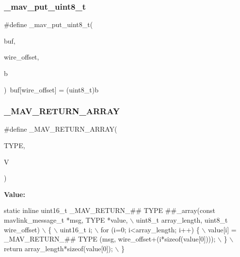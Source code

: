 \mbox{\label{protocol_8h_a25eacf3d37971b0b54c67e338d9f481a}} 
\subsubsection{\+\_\+mav\+\_\+put\+\_\+uint8\+\_\+t}
{\footnotesize\ttfamily \#define \+\_\+mav\+\_\+put\+\_\+uint8\+\_\+t(\begin{DoxyParamCaption}\item[{}]{buf,  }\item[{}]{wire\+\_\+offset,  }\item[{}]{b }\end{DoxyParamCaption})~buf[wire\+\_\+offset] = (uint8\+\_\+t)b}

\mbox{\label{protocol_8h_a056ba05a9133c8e4362514ffc523a24b}} 
\subsubsection{\+\_\+\+M\+A\+V\+\_\+\+R\+E\+T\+U\+R\+N\+\_\+\+A\+R\+R\+AY}
{\footnotesize\ttfamily \#define \+\_\+\+M\+A\+V\+\_\+\+R\+E\+T\+U\+R\+N\+\_\+\+A\+R\+R\+AY(\begin{DoxyParamCaption}\item[{}]{T\+Y\+PE,  }\item[{}]{V }\end{DoxyParamCaption})}

{\bfseries Value\+:}
\begin{DoxyCode}
\textcolor{keyword}{static} \textcolor{keyword}{inline} uint16\_t \_MAV\_RETURN\_## TYPE ##\_array(\textcolor{keyword}{const} mavlink\_message\_t *msg, TYPE *value, \(\backslash\)
                             uint8\_t array\_length, uint8\_t wire\_offset) \(\backslash\)
\{ \(\backslash\)
    uint16\_t i; \(\backslash\)
    for (i=0; i<array\_length; i++) \{ \(\backslash\)
        value[i] = \_MAV\_RETURN\_## TYPE (msg, wire\_offset+(i*\textcolor{keyword}{sizeof}(value[0]))); \(\backslash\)
    \} \(\backslash\)
    return array\_length*\textcolor{keyword}{sizeof}(value[0]); \(\backslash\)
\}
\end{DoxyCode}
\mbox{\label{protocol_8h_a2ce2c9077675f00ed5854c12c6aa239a}} 
